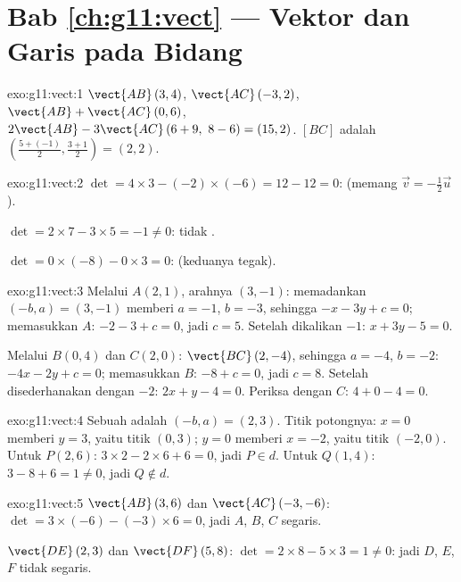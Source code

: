 \section*{Bab \ref{ch:g11:vect} --- Vektor dan Garis pada Bidang}

\begin{solution}{exo:g11:vect:1}
$\vect{AB}\,(3, 4)$, $\vect{AC}\,(-3, 2)$,
$\vect{AB} + \vect{AC}\,(0, 6)$,
$2\vect{AB} - 3\vect{AC}\,(6 + 9,\ 8 - 6) = (15, 2)$. 
$[BC]$ adalah $\left(\frac{5 + (-1)}{2}, \frac{3+1}{2}\right) = (2, 2)$.
\end{solution}

\begin{solution}{exo:g11:vect:2}
$\det = 4 \times 3 - (-2) \times (-6) = 12 - 12 = 0$:  (memang
$\vec v = -\frac12 \vec u$).

$\det = 2 \times 7 - 3 \times 5 = -1 \neq 0$: tidak .

$\det = 0 \times (-8) - 0 \times 3 = 0$:  (keduanya tegak).
\end{solution}

\begin{solution}{exo:g11:vect:3}
Melalui $A(2,1)$, arahnya $(3, -1)$: memadankan $(-b, a) = (3, -1)$ memberi
$a = -1$, $b = -3$, sehingga $-x - 3y + c = 0$; memasukkan $A$: $-2 - 3 + c =
0$, jadi $c = 5$. Setelah dikalikan $-1$: $x + 3y - 5 = 0$.

Melalui $B(0,4)$ dan $C(2,0)$: $\vect{BC}\,(2, -4)$, sehingga $a = -4$,
$b = -2$: $-4x - 2y + c = 0$; memasukkan $B$: $-8 + c = 0$, jadi $c = 8$.
Setelah disederhanakan dengan $-2$: $2x + y - 4 = 0$. Periksa dengan $C$: $4 + 0 - 4 = 0$.
\end{solution}

\begin{solution}{exo:g11:vect:4}
Sebuah  adalah $(-b, a) = (2, 3)$. Titik potongnya: $x = 0$
memberi $y = 3$, yaitu titik $(0, 3)$; $y = 0$ memberi $x = -2$, yaitu titik
$(-2, 0)$. Untuk $P(2,6)$: $3 \times 2 - 2 \times 6 + 6 = 0$, jadi $P \in d$.
Untuk $Q(1,4)$: $3 - 8 + 6 = 1 \neq 0$, jadi $Q \notin d$.
\end{solution}

\begin{solution}{exo:g11:vect:5}
$\vect{AB}\,(3, 6)$ dan $\vect{AC}\,(-3, -6)$:
$\det = 3 \times (-6) - (-3) \times 6 = 0$, jadi $A$, $B$, $C$ segaris.

$\vect{DE}\,(2, 3)$ dan $\vect{DF}\,(5, 8)$:
$\det = 2 \times 8 - 5 \times 3 = 1 \neq 0$: jadi $D$, $E$, $F$ tidak
segaris.
\end{solution}


